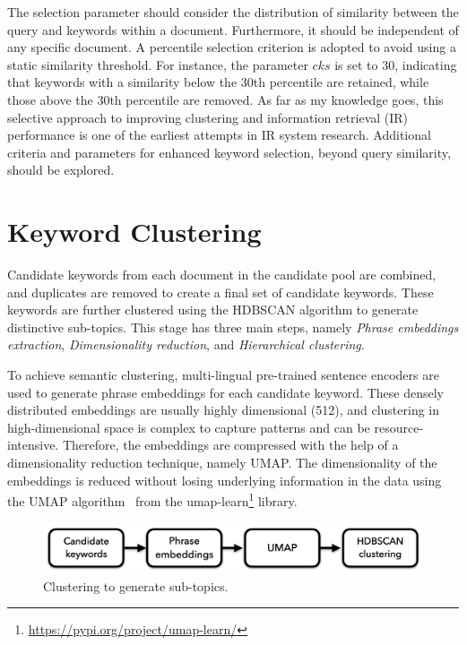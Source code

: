 The selection parameter should consider the distribution of similarity between the query and keywords within a document. Furthermore, it should be independent of any specific document. A percentile selection criterion is adopted to avoid using a static similarity threshold. For instance, the parameter $cks$ is set to 30, indicating that keywords with a similarity below the 30th percentile are retained, while those above the 30th percentile are removed. As far as my knowledge goes, this selective approach to improving clustering and information retrieval (IR) performance is one of the earliest attempts in IR system research. Additional criteria and parameters for enhanced keyword selection, beyond query similarity, should be explored.



\section{Keyword Clustering}

Candidate keywords from each document in the candidate pool are combined, and duplicates are removed to create a final set of candidate keywords. These keywords are further clustered using the HDBSCAN algorithm to generate distinctive sub-topics. This stage has three main steps, namely \textit{Phrase embeddings extraction}, \textit{Dimensionality reduction}, and \textit{Hierarchical clustering}. 

To achieve semantic clustering, multi-lingual pre-trained sentence encoders are used to generate phrase embeddings for each candidate keyword. These densely distributed embeddings are usually highly dimensional (512), and clustering in high-dimensional space is complex to capture patterns and can be resource-intensive. Therefore, the embeddings are compressed with the help of a dimensionality reduction technique, namely UMAP. The dimensionality of the embeddings is reduced without losing underlying information in the data using the UMAP algorithm~\cite{mcinnes2018umap} from the umap-learn\footnote{\url{https://pypi.org/project/umap-learn/}} library.




\begin{figure}[h]
	\centering
	\includegraphics[width=.9\textwidth]{images/thesis_images/clustering.png}
	\caption{Clustering to generate sub-topics.  \label{fig:clustering}}
\end{figure}

